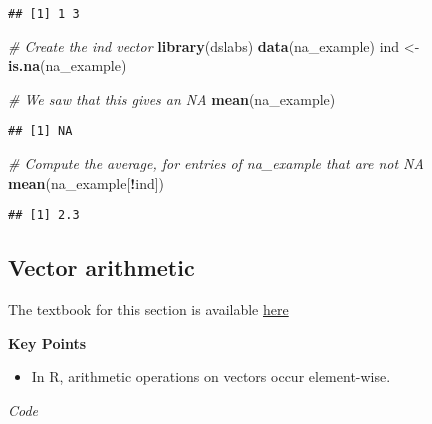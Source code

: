 \documentclass[]{article}
\newenvironment{Shaded}{\begin{snugshade}}{\end{snugshade}}
\newcommand{\CommentTok}[1]{\textcolor[rgb]{0.56,0.35,0.01}{\textit{#1}}}
\newcommand{\KeywordTok}[1]{\textcolor[rgb]{0.13,0.29,0.53}{\textbf{#1}}}
\newcommand{\NormalTok}[1]{#1}
\newcommand{\OperatorTok}[1]{\textcolor[rgb]{0.81,0.36,0.00}{\textbf{#1}}}
\newcommand{\StringTok}[1]{\textcolor[rgb]{0.31,0.60,0.02}{#1}}
\providecommand{\tightlist}{%
  \setlength{\itemsep}{0pt}\setlength{\parskip}{0pt}}
\begin{document}
\begin{verbatim}
## [1] 1 3
\end{verbatim}

\begin{Shaded}
\begin{Highlighting}[]
\CommentTok{# Create the ind vector}
\KeywordTok{library}\NormalTok{(dslabs)}
\KeywordTok{data}\NormalTok{(na_example)}
\NormalTok{ind <-}\StringTok{ }\KeywordTok{is.na}\NormalTok{(na_example)}

\CommentTok{# We saw that this gives an NA}
\KeywordTok{mean}\NormalTok{(na_example)}
\end{Highlighting}
\end{Shaded}

\begin{verbatim}
## [1] NA
\end{verbatim}

\begin{Shaded}
\begin{Highlighting}[]
\CommentTok{# Compute the average, for entries of na_example that are not NA}
\KeywordTok{mean}\NormalTok{(na_example[}\OperatorTok{!}\NormalTok{ind])}
\end{Highlighting}
\end{Shaded}

\begin{verbatim}
## [1] 2.3
\end{verbatim}

\hypertarget{vector-arithmetic}{%
\subsection{Vector arithmetic}\label{vector-arithmetic}}

The textbook for this section is available
\href{https://rafalab.github.io/dsbook/r-basics.html\#vector-arithmetics}{here}

\textbf{Key Points}

\begin{itemize}
\tightlist
\item
  In R, arithmetic operations on vectors occur element-wise.
\end{itemize}

\emph{Code}

\begin{Shaded}
\end{Shaded}
\end{document}
